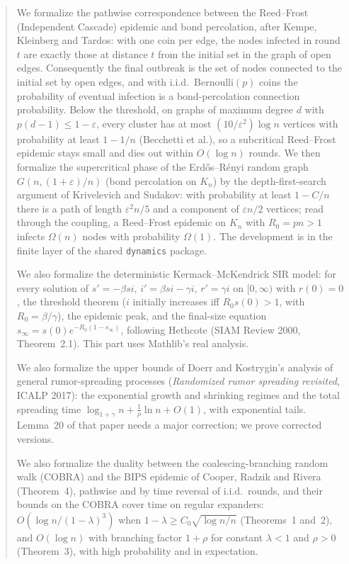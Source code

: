 \begin{abstract}
We formalize the pathwise correspondence between the Reed--Frost (Independent Cascade) epidemic
and bond percolation, after Kempe, Kleinberg and Tardos: with one coin per edge, the nodes
infected in round $t$ are exactly those at distance $t$ from the initial set in the graph of
open edges. Consequently the final outbreak is the set of nodes connected to the initial set by
open edges, and with i.i.d.\ Bernoulli$(p)$ coins the probability of eventual infection is a
bond-percolation connection probability. Below the threshold, on graphs of maximum degree $d$ with
$p(d-1)\le1-\varepsilon$, every cluster has at most $(10/\varepsilon^2)\log n$ vertices with
probability at least $1-1/n$ (Becchetti et al.), so a subcritical Reed--Frost epidemic stays
small and dies out within $O(\log n)$ rounds. We then formalize the supercritical phase of the
Erd\H{o}s--R\'enyi random graph $G(n,(1+\varepsilon)/n)$ (bond percolation on $K_n$) by the
depth-first-search argument of Krivelevich and Sudakov: with probability at least $1-C/n$ there is
a path of length $\varepsilon^2 n/5$ and a component of $\varepsilon n/2$ vertices; read through
the coupling, a Reed--Frost epidemic on $K_n$ with $R_0=pn>1$ infects $\Omega(n)$ nodes with
probability $\Omega(1)$. The development is in the finite layer of the shared \texttt{dynamics}
package.

We also formalize the deterministic Kermack--McKendrick SIR model: for every solution of
$s'=-\beta si$, $i'=\beta si-\gamma i$, $r'=\gamma i$ on $[0,\infty)$ with $r(0)=0$, the threshold
theorem ($i$ initially increases iff $R_0s(0)>1$, with $R_0=\beta/\gamma$), the epidemic peak, and
the final-size equation $s_\infty=s(0)e^{-R_0(1-s_\infty)}$, following Hethcote (SIAM Review
2000, Theorem~2.1). This part uses Mathlib's real analysis.

We also formalize the upper bounds of Doerr and Kostrygin's analysis of general rumor-spreading
processes (\emph{Randomized rumor spreading revisited}, ICALP 2017): the exponential growth and
shrinking regimes and the total spreading time $\log_{1+\gamma}n+\frac1\rho\ln n+O(1)$, with
exponential tails. Lemma~20 of that paper needs a major correction; we prove corrected versions.

We also formalize the duality between the coalescing-branching random walk (COBRA) and the BIPS
epidemic of Cooper, Radzik and Rivera (Theorem~4), pathwise and by time reversal of i.i.d.\ rounds,
and their bounds on the COBRA cover time on regular expanders: $O(\log n/(1-\lambda)^3)$ when
$1-\lambda\ge C_0\sqrt{\log n/n}$ (Theorems~1 and~2), and $O(\log n)$ with branching factor
$1+\rho$ for constant $\lambda<1$ and $\rho>0$ (Theorem~3), with high probability and in
expectation.
\end{abstract}


